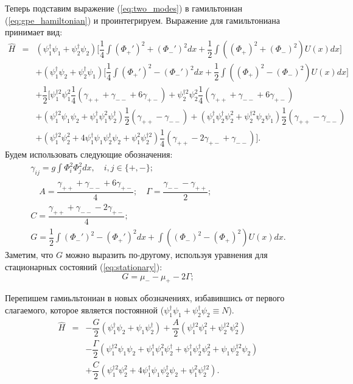\documentclass[12pt]{article}
\begin{document}
Теперь подставим выражение (\ref{eq:two_modes}) в гамильтониан (\ref{eq:gpe_hamiltonian}) и проинтегрируем.
Выражение для гамильтониана принимает вид:
%
\begin{eqnarray*}
\hat{H} & = & (\psi_1^\dag \psi_1 + \psi_2^\dag \psi_2) \Big[ \dfrac{1}{4} \int (\Phi_+')^2 + (\Phi_-')^2  dx + \dfrac{1}{2} \int ((\Phi_+)^2 + (\Phi_-)^2) U(x) dx \Big] \\[10pt]
&& +(\psi_1^\dag \psi_2 + \psi_2^\dag \psi_1) \Big[ \dfrac{1}{4} \int (\Phi_+')^2 - (\Phi_-')^2 dx + \dfrac{1}{2} \int ((\Phi_+)^2 - (\Phi_-)^2)U(x) dx \Big] \\[10pt]
&& +\dfrac{1}{2} \Big[ \psi_1^{\dag 2} \psi_1^2 \dfrac{1}{4} (\gamma_{++} + \gamma_{--} + 6 \gamma_{+-}) + \psi_2^{\dag 2} \psi_2^2 \dfrac{1}{4}(\gamma_{++} + \gamma_{--} + 6 \gamma_{+-})  \\[10pt]
&& +(\psi_1^{\dag 2} \psi_1 \psi_2 + \psi_1^\dag \psi_1^2 \psi_2^\dag) \dfrac{1}{2}(\gamma_{++} - \gamma_{--}) + (\psi_1^\dag \psi_2^\dag \psi_2^2 + \psi_2^{\dag 2} \psi_2 \psi_1) \dfrac{1}{2} (\gamma_{++} - \gamma_{--})\\[10pt]
&& + (\psi_1^{\dag 2} \psi_2^2 + 4 \psi_1^\dag \psi_1 \psi_2^\dag \psi_2 + \psi_1^2 \psi_2^{\dag 2}) \dfrac{1}{4} (\gamma_{++} - 2 \gamma_{+-} + \gamma_{--}) \Big].
\end{eqnarray*}
%
Будем использовать следующие обозначения:
%
\begin{equation}
\begin{array}{c}
	\gamma_{ij} = g \int \Phi_i^2 \Phi_j^2 dx, \quad i,j \in \{+,-\}; \\[10pt]
	\quad A = \dfrac{\gamma_{++} + \gamma_{--} + 6 \gamma_{+-}}{4}; \quad \Gamma = \dfrac{\gamma_{--} - \gamma_{++}}{2}; \\[10pt]
	C = \dfrac{\gamma_{++} + \gamma_{--} - 2\gamma_{+-}}{4}; \\[10pt]
	G = \dfrac{1}{2} \int (\Phi_-')^2 - (\Phi_+')^2 dx + \int ((\Phi_-)^2 - (\Phi_+)^2)U(x) dx.
\end{array}
\label{eq:subs}
\end{equation}
%
Заметим, что $G$ можно выразить по-другому, используя уравнения для стационарных состояний (\ref{eq:stationary}):
%
\begin{equation}
G = \mu_- - \mu_+ - 2\Gamma;
\end{equation}
%

Перепишем гамиьльтониан в новых обозначениях, избавившись от первого слагаемого, которое является постоянной ($\psi_1^\dag \psi_1 + \psi_2^\dag \psi_2 \equiv N$).
%
\begin{equation}
\begin{array}{lcl}
	\hat{H} & = & -\dfrac{G}{2} (\psi_1^\dag \psi_2 +  \psi_1 \psi_2^\dag) + \dfrac{A}{2} (\psi_1^{\dag 2} \psi_1^2 + \psi_2^{\dag 2} \psi_2^2) \\[10pt]
	& & -\dfrac{\Gamma}{2} (\psi_1^{\dag 2} \psi_1 \psi_2 + \psi_1^\dag \psi_1^2 \psi_2^\dag + \psi_1^\dag \psi_2^\dag \psi_2^2 + \psi_1 \psi_2^{\dag 2} \psi_2) \\[10pt]
	& & +\dfrac{C}{2} (\psi_1^{\dag 2} \psi_2^2 + 4 \psi_1^\dag \psi_1 \psi_2^\dag \psi_2 + \psi_1^2 \psi_2^{\dag 2}).
\end{array}
\label{eq:hamiltonian}
\end{equation}
%
\end{document}
